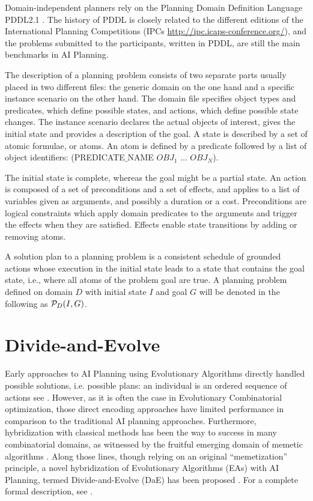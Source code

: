 \documentclass{MYsig-alternate}
\begin{document}
Domain-independent planners rely on the Planning Domain Definition Language PDDL2.1 \cite{Fox-JAIR-2003}. The history of PDDL is closely related to the different editions of the International Planning Competitions (IPCs \url{http://ipc.icaps-conference.org/}), and the problems submitted to the participants, written in PDDL, are still the main benchmarks in AI Planning.

The description of a planning problem consists of two separate parts usually placed in two different files: the generic domain on the one hand and a specific instance scenario on the other hand. The domain file specifies object types and predicates, which define possible states, and actions, which define possible state changes. The instance scenario declares the actual objects of interest, gives the initial state and provides a description of the goal. A state is described by a set of atomic formulae, or atoms. An atom is defined by a predicate followed by a list of object identifiers: (PREDICATE$\_$NAME $OBJ_1$ ... $OBJ_N$). 

The initial state is complete, whereas the goal might be a partial state. An action is composed of a set of preconditions and a set of effects, and applies to a list of variables given as arguments, and possibly a duration or a cost. Preconditions are logical constraints which apply domain predicates to the arguments and trigger the effects when they are satisfied. Effects enable state transitions by adding or removing atoms.

A solution plan to a planning problem is a consistent schedule of grounded actions whose execution in the initial state leads to a state that contains the goal state, i.e., where all atoms of the problem goal are true. A planning problem defined on domain $D$ with initial state $I$ and goal $G$ will be denoted in the following as ${\cal P}_D(I,G)$.

\section{Divide-and-Evolve}

\label{section:dae}

Early approaches to AI Planning using Evolutionary Algorithms directly handled possible solutions, i.e. possible plans: an individual is an ordered sequence of actions see \cite{Spector-AAAI-94,muslea97,westerberg:2000,westerberg:2001,Morignot-2005}. However, as it is often the case in Evolutionary Combinatorial optimization, those direct encoding approaches have limited performance in comparison to the traditional AI planning approaches. Furthermore, hybridization with classical methods has been the way to success in many combinatorial domains, as witnessed by the fruitful emerging domain of memetic algorithms \cite{MemeticBook:2005}. Along those lines, though relying on an original ``memetization'' principle, a novel hybridization of Evolutionary Algorithms (EAs) with AI Planning, termed Divide-and-Evolve (DaE) has been proposed \cite{DAE:EvoCOP06,DAE:book-2007}. For a complete formal description, see \cite{Bibai:ICAPS2010}.
\end{document}
